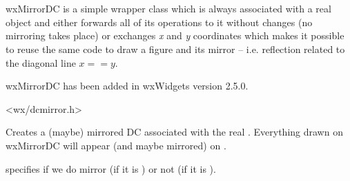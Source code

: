 
\section{}\label{wxmirrordc}

wxMirrorDC is a simple wrapper class which is always associated with a real 
 object and either forwards all of its operations to it
without changes (no mirroring takes place) or exchanges {\it x} and {\it y} 
coordinates which makes it possible to reuse the same code to draw a figure and
its mirror -- i.e. reflection related to the diagonal line $x == y$.

wxMirrorDC has been added in wxWidgets version 2.5.0.




<wx/dcmirror.h>





\label{wxmirrordcwxmirrordc}


Creates a (maybe) mirrored DC associated with the real . Everything
drawn on wxMirrorDC will appear (and maybe mirrored) on .

 specifies if we do mirror (if it is \true) or not (if it is 
\false).

